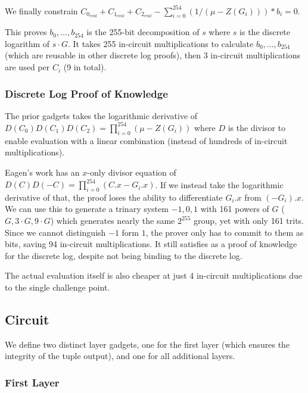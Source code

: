 \documentclass[]{article}
\begin{document}
We finally constrain $C_{0_{eval}} + C_{1_{eval}} + C_{2_{eval}} - \sum_{i=0}^{254} (1 / (\mu - Z(G_i))) * b_i = 0$.

This proves $b_0, ..., b_{254}$ is the 255-bit decomposition of $s$ where $s$ is the discrete logarithm of $s \cdot G$. It takes 255 in-circuit multiplications to calculate $b_0, ..., b_{254}$ (which are reusable in other discrete log proofs), then 3 in-circuit multiplications are used per $C_i$ (9 in total).

\subsubsection{Discrete Log Proof of Knowledge}

The prior gadgets takes the logarithmic derivative of $D(C_0)D(C_1)D(C_2) = \prod_{i=0}^{254}(\mu - Z(G_i))$ where $D$ is the divisor to enable evaluation with a linear combination (instead of hundreds of in-circuit multiplications).

Eagen's work has an $x$-only divisor equation of $D(C)D(-C) = \prod_{i=0}^{254}(C.x - G_i.x)$. If we instead take the logarithmic derivative of that, the proof loses the ability to differentiate $G_i.x$ from $(-G_i).x$. We can use this to generate a trinary system $-1, 0, 1$ with 161 powers of $G$ ($G, 3 \cdot G, 9 \cdot G$) which generates nearly the same $2^{255}$ group, yet with only 161 trits. Since we cannot distinguish $-1$ form $1$, the prover only has to commit to them as bits, saving 94 in-circuit multiplications. It still satisfies as a proof of knowledge for the discrete log, despite not being binding to the discrete log.

The actual evaluation itself is also cheaper at just 4 in-circuit multiplications due to the single challenge point.

\subsection{Circuit}

We define two distinct layer gadgets, one for the first layer (which ensures the integrity of the tuple output), and one for all additional layers.

\subsubsection{First Layer}
\end{document}
